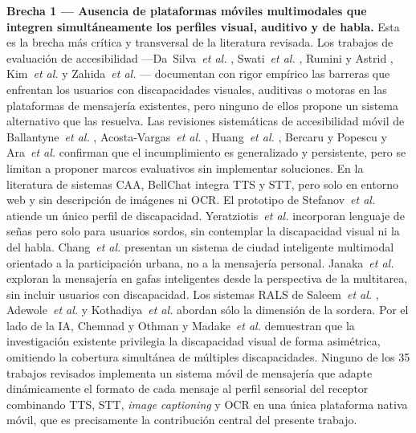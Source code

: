 \documentclass[journal]{IEEEtran}
\begin{document}
	\textbf{Brecha 1 --- Ausencia de plataformas m\'oviles multimodales que integren simult\'aneamente los perfiles visual, auditivo y de habla.} Esta es la brecha m\'as cr\'itica y transversal de la literatura revisada. Los trabajos de evaluaci\'on de accesibilidad ---Da~Silva~\textit{et al.} \cite{dasilva2016}, Swati~\textit{et al.} \cite{swati2021}, Rumini y Astrid \cite{rumini2019}, Kim~\textit{et al.} \cite{kim2024} y Zahida~\textit{et al.} \cite{zahida2021}--- documentan con rigor emp\'irico las barreras que enfrentan los usuarios con discapacidades visuales, auditivas o motoras en las plataformas de mensajer\'ia existentes, pero ninguno de ellos propone un sistema alternativo que las resuelva. Las revisiones sistem\'aticas de accesibilidad m\'ovil de Ballantyne~\textit{et al.} \cite{ballantyne2018}, Acosta-Vargas~\textit{et al.} \cite{acosta2021}, Huang~\textit{et al.} \cite{huang2025}, Bercaru y Popescu \cite{bercaru2024} y Ara~\textit{et al.} \cite{ara2024} confirman que el incumplimiento es generalizado y persistente, pero se limitan a proponer marcos evaluativos sin implementar soluciones. En la literatura de sistemas CAA, BellChat \cite{guerrero2021bellchat} integra TTS y STT, pero solo en entorno web y sin descripci\'on de im\'agenes ni OCR. El prototipo de Stefanov~\textit{et al.} \cite{stefanov2024} atiende un \'unico perfil de discapacidad. Yeratziotis~\textit{et al.} \cite{yeratziotis2023} incorporan lenguaje de se\~nas pero solo para usuarios sordos, sin contemplar la discapacidad visual ni la del habla. Chang~\textit{et al.} \cite{chang2022} presentan un sistema de ciudad inteligente multimodal orientado a la participaci\'on urbana, no a la mensajer\'ia personal. Janaka~\textit{et al.} \cite{janaka2023} exploran la mensajer\'ia en gafas inteligentes desde la perspectiva de la multitarea, sin incluir usuarios con discapacidad. Los sistemas RALS de Saleem~\textit{et al.} \cite{saleem2023}, Adewole~\textit{et al.} \cite{papatsimouli2023} y Kothadiya~\textit{et al.} \cite{kothadiya2022} abordan s\'olo la dimensi\'on de la sordera. Por el lado de la IA, Chemnad y Othman \cite{chemnad2024} y Madake~\textit{et al.} \cite{madake2023} demuestran que la investigaci\'on existente privilegia la discapacidad visual de forma asim\'etrica, omitiendo la cobertura simult\'anea de m\'ultiples discapacidades. Ninguno de los 35 trabajos revisados implementa un sistema m\'ovil de mensajer\'ia que adapte din\'amicamente el formato de cada mensaje al perfil sensorial del receptor combinando TTS, STT, \textit{image captioning} y OCR en una \'unica plataforma nativa m\'ovil, que es precisamente la contribuci\'on central del presente trabajo.
	
\end{document}
